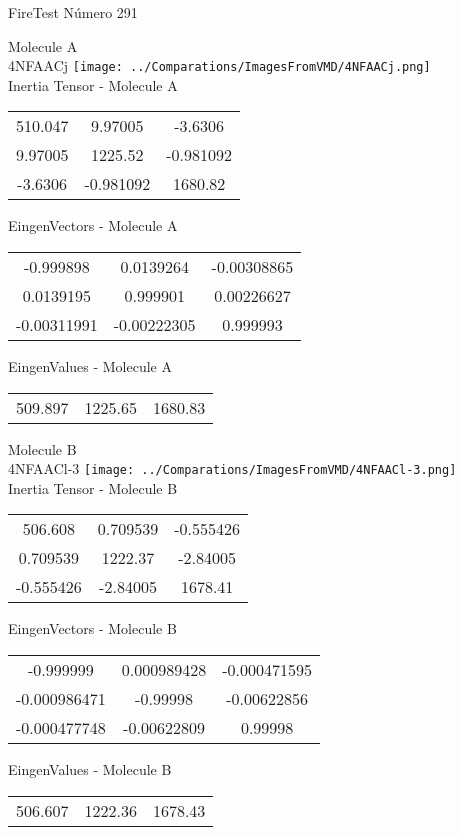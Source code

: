 \vtab[-2cm]
\begin{center}
{\large FireTest \tab Número 291}
\end{center}
\begin{multicols}{2}
\begin{center}

Molecule A \\ 
4NFAACj
\texttt{[image: ../Comparations/ImagesFromVMD/4NFAACj.png]}
\\
Inertia Tensor - Molecule A \\
\vtab

\begin{tabular}{|c c c|}
510.047	 & 	9.97005	 & 	-3.6306	 \\
9.97005	 & 	1225.52	 & 	-0.981092	 \\
-3.6306	 & 	-0.981092	 & 	1680.82
\end{tabular}

\vtab
 EingenVectors - Molecule A     \\
\vtab
\begin{tabular}{|c c c|}
-0.999898	 & 	0.0139264	 & 	-0.00308865	 \\
0.0139195	 & 	0.999901	 & 	0.00226627	 \\
-0.00311991	 & 	-0.00222305	 & 	0.999993
\end{tabular}

\vtab
 EingenValues - Molecule A     \\
\vtab
\begin{tabular}{|c c c|}
509.897	 & 	1225.65	 & 	1680.83	 \\
\end{tabular}
\columnbreak

Molecule B \\ 
4NFAACl-3
\texttt{[image: ../Comparations/ImagesFromVMD/4NFAACl-3.png]}
\\
Inertia Tensor - Molecule B \\
\vtab

\begin{tabular}{|c c c|}
506.608	 & 	0.709539	 & 	-0.555426	 \\
0.709539	 & 	1222.37	 & 	-2.84005	 \\
-0.555426	 & 	-2.84005	 & 	1678.41
\end{tabular}

\vtab
 EingenVectors - Molecule B     \\
\vtab
\begin{tabular}{|c c c|}
-0.999999	 & 	0.000989428	 & 	-0.000471595	 \\
-0.000986471	 & 	-0.99998	 & 	-0.00622856	 \\
-0.000477748	 & 	-0.00622809	 & 	0.99998
\end{tabular}

\vtab
 EingenValues - Molecule B     \\
\vtab
\begin{tabular}{|c c c|}
506.607	 & 	1222.36	 & 	1678.43	 \\
\end{tabular}

\end{center}
\end{multicols}
